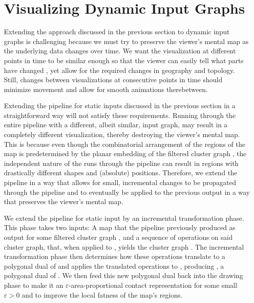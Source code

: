 \chapter{Visualizing Dynamic Input Graphs}
\label{chap:visualizing-dynamic-input-graphs}

Extending the approach discussed in the previous section to dynamic input graphs is challenging because we must try to preserve the viewer's mental map as the underlying data changes over time.
We want the visualization at different points in time to be similar enough so that the viewer can easily tell what parts have changed \cite{mashima2011visualizing}, yet allow for the required changes in geography and topology.
Still, changes between visualizations at consecutive points in time should minimize movement and allow for smooth animations therebetween.

Extending the pipeline for static inputs discussed in the previous section in a straightforward way will not satisfy these requirements.
Running through the entire pipeline with a different, albeit similar, input graph, may result in a completely different visualization, thereby destroying the viewer's mental map.
This is because even though the combinatorial arrangement of the regions of the map  is predetermined by the planar embedding of the filtered cluster graph , the independent nature of the runs through the pipeline can result in regions with drastically different shapes and (absolute) positions.
Therefore, we extend the pipeline in a way that allows for small, incremental changes to be propagated through the pipeline and to eventually be applied to the previous output in a way that preserves the viewer's mental map.

We extend the pipeline for static input by an incremental transformation phase.
This phase takes two inputs:
A map  that the pipeline previously produced as output for some filtered cluster graph , and a sequence of operations on said cluster graph, that, when applied to , yields the cluster graph .
The incremental transformation phase then determines how these operations translate to a polygonal dual of  and applies the translated operations to , producing , a polygonal dual of .
We then feed this new polygonal dual back into the drawing phase to make it an $\varepsilon$-area-proportional contact representation  for some small $\varepsilon > 0$ and to improve the local fatness of the map's regions.

